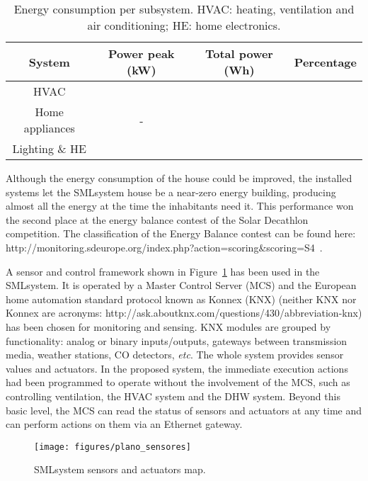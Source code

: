 \documentclass[energies,article,accept,moreauthors,pdftex,12pt,a4paper]{mdpi}
\newcommand{\mcs}{MCS\xspace}
\newcommand{\knx}{KNX\xspace}
\newcommand{\smlsystem}{SMLsystem\xspace}
\begin{document}
\begin{table}[H] \footnotesize \centering
 \begin{tabular}{cccc}
 \toprule
	{\bf System} & {\bf Power peak (kW)} & {\bf Total power (Wh)} & {\bf Percentage} \\
	 \midrule
 HVAC &  &  &  \\ 

 Home appliances & - & 	&  \\

 Lighting \& HE &  &  &  \\
 \bottomrule 
 \end{tabular}
 \caption{Energy consumption per subsystem. HVAC: heating, ventilation and air conditioning; HE: home electronics.\label{tab:consumption}}
\end{table}




Although the energy consumption of the house could be improved, the installed
systems let the \smlsystem house be a near-zero energy building, producing
almost all the energy at the time the inhabitants need it. This performance won the second place at the energy balance contest of the Solar Decathlon
competition. The classification of the Energy Balance contest can be found
 here: http://monitoring.sdeurope.org/index.php?action=scoring\&scoring=S4~.



A sensor and control framework shown in Figure~\ref{fig:plano_sensores}
has been used in the \smlsystem. It is operated by a Master Control
Server (\mcs) and the European home automation standard protocol
known as Konnex (\knx) (neither KNX nor Konnex are acronyms: http://ask.aboutknx.com/questions/430/abbreviation-knx)
 has been chosen for monitoring and sensing.
\knx modules are grouped by functionality: analog or binary inputs/outputs,
gateways between transmission media, weather stations, CO detectors, {\it etc}.
The whole system provides  sensor values and  actuators.
In the proposed system, the immediate execution actions had been programmed to
operate without the involvement of the \mcs, such as controlling ventilation,
the HVAC system and the DHW system. Beyond this basic level, the \mcs
can read the status of sensors and actuators at any time and can
perform actions on them via an Ethernet gateway.

\begin{figure}[H]
 \centering
 \texttt{[image: figures/plano\_sensores]}
 \caption{\smlsystem sensors and actuators map.\label{fig:plano_sensores}}
\end{figure}
\end{document}
